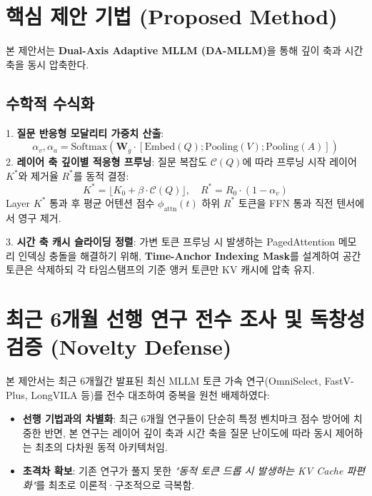 \documentclass[10pt, a4paper, twocolumn]{article}
\begin{document}
\section{핵심 제안 기법 (Proposed Method)}
본 제안서는 \textbf{Dual-Axis Adaptive MLLM (DA-MLLM)}을 통해 깊이 축과 시간 축을 동시 압축한다.

\subsection{수학적 수식화}
1. \textbf{질문 반응형 모달리티 가중치 산출}:
\begin{equation}
\alpha_v, \alpha_a = \text{Softmax}(\mathbf{W}_g \cdot [\text{Embed}(Q); \text{Pooling}(V); \text{Pooling}(A)])
\end{equation}
2. \textbf{레이어 축 깊이별 적응형 프루닝}:
질문 복잡도 $\mathcal{C}(Q)$에 따라 프루닝 시작 레이어 $K^*$와 제거율 $R^*$를 동적 결정:
\begin{equation}
K^* = \lfloor K_0 + \beta \cdot \mathcal{C}(Q) \rfloor, \quad R^* = R_0 \cdot (1 - \alpha_v)
\end{equation}
Layer $K^*$ 통과 후 평균 어텐션 점수 $\phi_{\text{attn}}(t)$ 하위 $R^*$ 토큰을 FFN 통과 직전 텐서에서 영구 제거.

3. \textbf{시간 축 캐시 슬라이딩 정렬}:
가변 토큰 프루닝 시 발생하는 PagedAttention 메모리 인덱싱 충돌을 해결하기 위해, \textbf{Time-Anchor Indexing Mask}를 설계하여 공간 토큰은 삭제하되 각 타임스탬프의 기준 앵커 토큰만 KV 캐시에 압축 유지.

\section{최근 6개월 선행 연구 전수 조사 및 독창성 검증 (Novelty Defense)}
본 제안서는 최근 6개월간 발표된 최신 MLLM 토큰 가속 연구(OmniSelect, FastV-Plus, LongVILA 등)를 전수 대조하여 중복을 원천 배제하였다:
\begin{itemize}
    \item \textbf{선행 기법과의 차별화}: 최근 6개월 연구들이 단순히 특정 벤치마크 점수 방어에 치중한 반면, 본 연구는 레이어 깊이 축과 시간 축을 질문 난이도에 따라 동시 제어하는 최초의 다차원 동적 아키텍처임.
    \item \textbf{초격차 확보}: 기존 연구가 풀지 못한 \textit{"동적 토큰 드롭 시 발생하는 KV Cache 파편화"}를 최초로 이론적·구조적으로 극복함.
\end{itemize}
\end{document}
